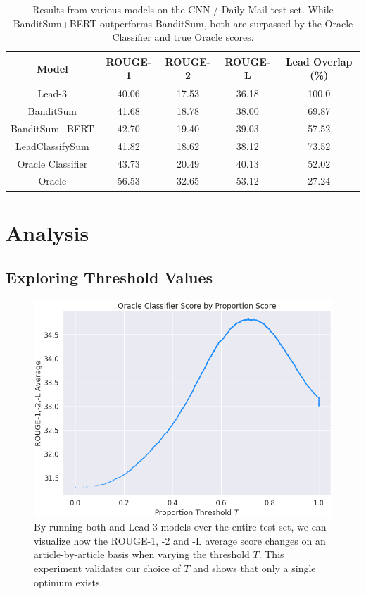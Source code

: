 \begin{table}[h]
    \centering
    \begin{tabular}{c|c|c|c|c}
    \toprule
    Model	&	ROUGE-1	&	ROUGE-2	&	ROUGE-L	&	Lead Overlap (\%)	\\ \hline
    Lead-3	&	40.06	&	17.53	&	36.18	&	100.0	\\
    BanditSum 	&	41.68	&	18.78	&	38.00	&	69.87	\\
    BanditSum+BERT	&	42.70	&	19.40	&	39.03	&	57.52	\\ \hline
    LeadClassifySum	&	41.82	&	18.62	&	38.12	&	73.52	\\ \hline
    Oracle Classifier	&	43.73	&	20.49	&	40.13	&	52.02	\\
    Oracle	&	56.53	&	32.65	&	53.12	&	27.24	\\ \bottomrule
    \end{tabular}
    \caption[LeadClassifySum ROUGE results on CNN / Daily Mail test set.]{Results from various models on the CNN / Daily Mail test set. While BanditSum+BERT outperforms BanditSum, both are surpassed by the Oracle Classifier and true Oracle scores.}
    \label{tab:banditsum_bert}
\end{table}

\section{Analysis}
\subsection{Exploring Threshold Values}
\begin{figure}[h]
    \centering
    \includegraphics[width=0.75\linewidth]{fig/oracle_lead_classifier_thresholds.png}
    \caption[A fine-grained analysis of summarization performance change when the threshold is varied.]{By running both \BanSumLate{} and Lead-3 models over the entire test set, we can visualize how the ROUGE-1, -2 and -L average score changes on an article-by-article basis when varying the threshold $T$. This experiment validates our choice of $T$ and shows that only a single optimum exists.}
    \label{fig:oracle_classifier_threshold}
\end{figure}

